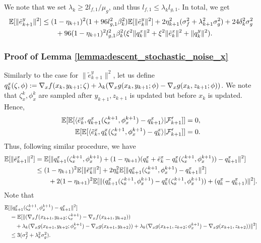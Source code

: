 We note that we set $\lambda_k \ge 2l_{f,1} / \mu_g$, and thus $l_{f,1} \le \lambda_k l_{g,1}$. In total, we get
\begin{align*}
    \mathbb{E}[\| \tilde{e}_{k+1}^y\|^2 ] &\le (1-\eta_{k+1})^2 (1 + 96 l_{g,1}^2 \beta_k^2 ) \mathbb{E}[\| \tilde{e}_{k}^y\|^2 ] + 2 \eta_{k+1}^2 (\sigma_f^2 + \lambda_{k+1}^2 \sigma_g^2) + 24 \delta_k^2 \sigma_g^2 \\
    &\qquad + 96 (1-\eta_{k+1})^2 l_{g,1}^2 \beta_k^2 (\xi^2 \|q_k^x\|^2 + \xi^2 \|\tilde{e}_k^x\|^2 + \|q_k^y\|^2).
\end{align*}



\subsubsection{Proof of Lemma \ref{lemma:descent_stochastic_noise_x}}
\label{appendix:proof_stochastic_noise_x}
Similarly to the case for $\|\tilde{e}_{k+1}^y\|^2$, let us define $q_k^x (\zeta, \phi) := \nabla_x f(x_k, y_{k+1}; \zeta) + \lambda_k (\nabla_x g(x_k, y_{k+1}; \phi) - \nabla_x g(x_k, z_{k+1}; \phi))$. We note that $\zeta_x^k, \phi_{x}^k$ are sampled after $y_{k+1}, z_{k+1}$ is updated but before $x_k$ is updated. Hence, 
\begin{align*}
    \mathbb{E}[\mathbb{E}[\langle \tilde{e}_k^x, q_{k+1}^x(\zeta_x^{k+1}, \phi_{x}^{k+1}) - q_{k+1}^x \rangle | \mathcal{F}_{k+1}']] = 0, \\
    \mathbb{E}[\mathbb{E}[\langle \tilde{e}_k^x, q_{k}^x(\zeta_x^{k+1}, \phi_{x}^{k+1}) - q_{k}^x \rangle | \mathcal{F}_{k+1}']] = 0.
\end{align*}
Thus, following similar procedure, we have
\begin{align*}
    \mathbb{E}[\| \tilde{e}_{k+1}^x\|^2] &= \mathbb{E}[\| q_{k+1}^x(\zeta_x^{k+1}, \phi_{x}^{k+1}) + (1-\eta_{k+1}) (q_k^x + \tilde{e}_k^x - q_{k}^x (\zeta_x^{k+1}, \phi_{x}^{k+1}) ) - q_{k+1}^x \|^2] \\
    &\le (1 - \eta_{k+1})^2 \mathbb{E}[\| \tilde{e}_k^x\|^2 ] + 2\eta_k^2 \mathbb{E}[\|q_{k+1}^x (\zeta_x^{k+1}, \phi_{x}^{k+1}) - q_{k+1}^x\|^2] \\
    &\qquad + 2(1-\eta_{k+1})^2 \mathbb{E}[\| (q_{k+1}^x (\zeta_{x}^{k+1}, \phi_{x}^{k+1}) - q_k^x (\zeta_{x}^{k+1}, \phi_{x}^{k+1})) + (q_k^x - q_{k+1}^x)\|^2 ].
\end{align*}
Note that
\begin{align*}
    \mathbb{E}[&\|q_{k+1}^x (\zeta_x^{k+1}, \phi_{x}^{k+1}) - q_{k+1}^x\|^2] \\
    &= \mathbb{E}[\|(\nabla_x f(x_{k+1}, y_{k+2}; \zeta_x^{k+1}) - \nabla_x f(x_{k+1}, y_{k+2})) \\
    &\quad + \lambda_k (\nabla_x g(x_{k+1}, y_{k+2}; \phi_x^{k+1}) - \nabla_x g(x_{k+1}, y_{k+2})) + \lambda_k (\nabla_x g(x_{k+1}, z_{k+2}; \phi_x^{k+1}) - \nabla_x g(x_{k+1}, z_{k+2}))\|^2] \\
    &\le 3 (\sigma_f^2 + \lambda_k^2 \sigma_g^2). 
\end{align*}
